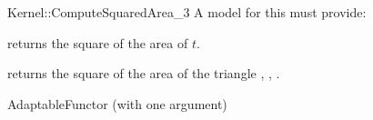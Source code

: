 \begin{ccRefFunctionObjectConcept}{Kernel::ComputeSquaredArea_3}
A model for this must provide:


       {returns the square of the area of $t$. }

{returns the square of the area of the triangle , , . }

\ccRefines
AdaptableFunctor (with one argument)

\ccSeeAlso
{}\\

\end{ccRefFunctionObjectConcept}
